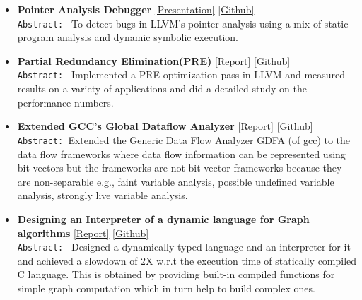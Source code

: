 \documentclass[9pt]{article}
\newenvironment{changemargin}[2]{%
  \begin{list}{}{%
    \setlength{\topsep}{0pt}%
    \setlength{\leftmargin}{#1}%
    \setlength{\rightmargin}{#2}%
    \setlength{\listparindent}{\parindent}%
    \setlength{\itemindent}{\parindent}%
    \setlength{\parsep}{\parskip}%
  }%
  \item[]}{\end{list}
}
\newenvironment{body} {
	\vspace*{-16pt}
	\begin{changemargin}{-0.25in}{-0.5in}
  }	
	{\end{changemargin}
}
\begin{document}
\begin{body}
\begin{itemize}
           \item \textbf{Pointer Analysis Debugger} 
             \href{https://sdasgup3.github.io/files/pa_debugger.pdf}{[Presentation]} 
           \href{https://github.com/sdasgup3/symbolic-analysis}{[Github]} \\
                                  \texttt{Abstract: } To detect bugs in LLVM's
                                  pointer analysis using a mix of static
                                  program analysis and dynamic symbolic
                                  execution. 

           \item \textbf{Partial Redundancy Elimination(PRE)} 
           \href{https://sdasgup3.github.io/files/report_cs526.pdf}{[Report]} 
           \href{https://github.com/sdasgup3/partial-redundancy-elimination}{[Github]} \\
                                  \texttt{Abstract: } Implemented a PRE
                                  optimization pass in LLVM and measured results
                                  on a variety of applications and did a detailed 
                                  study on the performance numbers. 

            \item \textbf{Extended GCC's Global Dataflow Analyzer} 
           \href{https://sdasgup3.github.io/files/report_gdfa.pdf}{[Report]} 
           \href{https://github.com/sdasgup3/non-separable-global-dataflow-framework}{[Github]} \\
                                \texttt{Abstract: }Extended the Generic Data Flow Analyzer
                                GDFA (of gcc) to the data flow frameworks where
                                data flow information can be represented using
                                bit vectors but the frameworks are not bit
                                vector frameworks because they are
                                non-separable e.g., faint variable analysis,
                                possible undefined variable analysis, strongly
                                live variable analysis.	

           \item \textbf{Designing an Interpreter of a dynamic language for Graph
algorithms}
           \href{https://sdasgup3.github.io/files/report_cs598dhp.pdf}{[Report]} 
           \href{https://github.com/sdasgup3/gri}{[Github]} \\
                                  \texttt{Abstract: } 
                                  Designed a dynamically typed language and an interpreter for it and 
                                  achieved a slowdown of 2X w.r.t the execution time of statically compiled C
                                  language. This is obtained by providing built-in compiled functions 
                                  for simple graph computation which in turn help to build complex
                                  ones.


\end{itemize}
\end{body}
\end{document}
